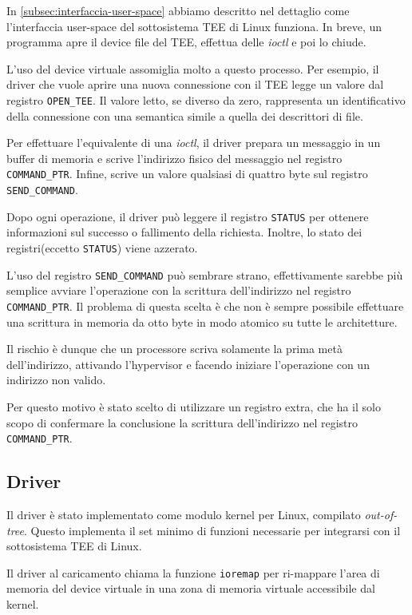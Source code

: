 \documentclass[12pt,italian]{report}
\begin{document}
In \ref{subsec:interfaccia-user-space} abbiamo descritto nel dettaglio
come l'interfaccia user-space del sottosistema TEE di Linux funziona.
In breve, un programma apre il device file del TEE, effettua delle
\textit{ioctl} e poi lo chiude.

L'uso del device virtuale assomiglia molto a questo processo.
Per esempio, il driver che vuole aprire una nuova connessione con il TEE
legge un valore dal registro \texttt{OPEN\_TEE}.
Il valore letto, se diverso da zero, rappresenta un identificativo
della connessione con una semantica simile a quella dei descrittori
di file.

Per effettuare l'equivalente di una \textit{ioctl}, il driver
prepara un messaggio in un buffer di memoria e scrive l'indirizzo
fisico del messaggio nel registro \texttt{COMMAND\_PTR}.
Infine, scrive un valore qualsiasi di quattro byte sul registro
\texttt{SEND\_COMMAND}.

Dopo ogni operazione, il driver può leggere il registro \texttt{STATUS}
per ottenere informazioni sul successo o fallimento della richiesta.
Inoltre, lo stato dei registri(eccetto \texttt{STATUS}) viene azzerato.

\bigbreak \noindent

L'uso del registro \texttt{SEND\_COMMAND} può sembrare strano,
effettivamente sarebbe più semplice avviare l'operazione con la
scrittura dell'indirizzo nel registro \texttt{COMMAND\_PTR}.
Il problema di questa scelta è che non è sempre possibile effettuare
una scrittura in memoria da otto byte in modo atomico su tutte le
architetture.

Il rischio è dunque che un processore scriva solamente la prima metà
dell'indirizzo, attivando l'hypervisor e facendo iniziare l'operazione
con un indirizzo non valido.

Per questo motivo è stato scelto di utilizzare un registro extra, che
ha il solo scopo di confermare la conclusione la scrittura dell'indirizzo
nel registro \texttt{COMMAND\_PTR}.

\subsection{Driver}
\label{subsection:driver}
Il driver è stato implementato come modulo kernel per Linux, compilato
\textit{out-of-tree}.
Questo implementa il set minimo di funzioni necessarie per integrarsi con
il sottosistema TEE di Linux.

Il driver al caricamento chiama la funzione \texttt{ioremap} per ri-mappare
l'area di memoria del device virtuale in una zona di memoria virtuale
accessibile dal kernel.
\end{document}

